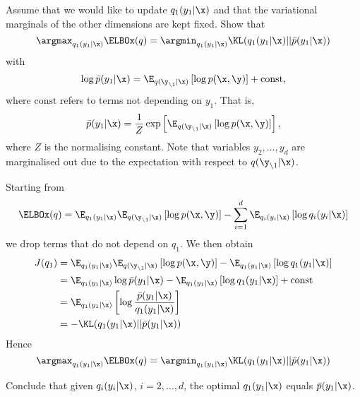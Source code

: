 \begin{exenumerate}
\item Assume that we would like to update $q_1(y_1 |\x)$ and that the
  variational marginals of the other dimensions are kept fixed. Show that
  \begin{equation}
    \argmax_{q_1(y_1|\x)} \ELBOx(q) = \argmin_{q_1(y_1|\x)} \KL(q_1(y_1|\x) || \bar{p}(y_1|\x))
  \end{equation}
  with
\begin{equation}
  \log \bar{p}(y_1|\x) = \E_{q(\y_{\setminus 1}|\x)}\left[ \log p(\x,\y)\right] + \text{const},
\end{equation}
where $\text{const}$ refers to terms not depending on $y_1$. That is,
\begin{equation}
\bar{p}(y_1|\x) = \frac{1}{Z} \exp\left[ \E_{q(\y_{\setminus
      1}|\x)}\left[ \log p(\x,\y)\right] \right],
\end{equation}
where $Z$ is the normalising constant. Note that variables $y_2, \ldots, y_d$
are marginalised out due to the expectation with respect to $q(\y_{\setminus
  1}|\x)$.

  \begin{solution}
    Starting from 
    \begin{equation}
      \ELBOx(q) = \E_{q_1(y_1|\x)} \E_{q(\y_{\setminus 1}|\x)}\left[ \log p(\x,\y)\right] - \sum_{i=1}^d \E_{q_i(y_i|\x)} \left[\log q_i(y_i|\x)\right]
    \end{equation}
    we drop terms that do not depend on $q_1$. We then obtain
    \begin{align}
      J(q_1) & =  \E_{q_1(y_1|\x)} \E_{q(\y_{\setminus 1}|\x)}\left[ \log p(\x,\y)\right] -  \E_{q_1(y_1|\x)} \left[\log q_1(y_1|\x)\right]\\
      & = \E_{q_1(y_1|\x)} \log \bar{p}(y_1|\x) - \E_{q_1(y_1|\x)} \left[\log q_1(y_1|\x)\right] + \text{const}\\
      & = \E_{q_1(y_1|\x)}\left[ \log \frac{\bar{p}(y_1|\x)}{ q_1(y_1|\x)} \right]\\
      & = -\KL( q_1(y_1|\x) || \bar{p}(y_1|\x) )
    \end{align}
    Hence
    \begin{equation}
      \argmax_{q_1(y_1|\x)} \ELBOx(q) = \argmin_{q_1(y_1|\x)} \KL(q_1(y_1|\x) || \bar{p}(y_1|\x))
    \end{equation}
    
  \end{solution}

\item Conclude that given $q_i(y_i|\x)$, $i=2, \ldots, d$, the optimal $q_1(y_1|\x)$ equals $\bar{p}(y_1|\x)$.


\end{exenumerate}

